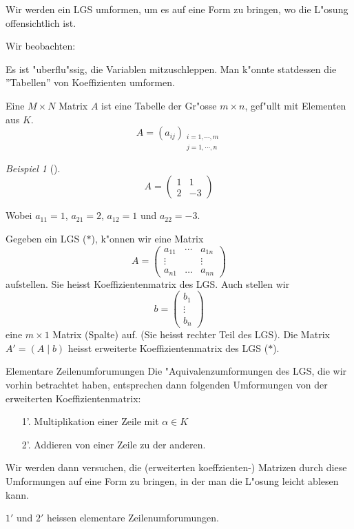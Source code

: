 \documentclass[11pt]{article}
\theoremstyle{remark}
\newtheorem{exa}{Beispiel}[section]
\theoremstyle{definition}
\theoremstyle{remark}
\begin{document}
Wir werden ein LGS umformen, um es auf eine Form zu bringen, wo die L"osung
offensichtlich ist.

Wir beobachten:
\begin{relation}
Es ist "uberflu"ssig, die Variablen mitzuschleppen. Man k"onnte statdessen die
''Tabellen'' von Koeffizienten umformen.
\end{relation}

\begin{definition}{}{}
Eine \(M\times N\) Matrix \(A\) ist eine Tabelle der Gr"osse \(m\times n\), gef"ullt
mit Elementen aus \(K\).  
\[A=(a_{ij})_{\substack{i=1,\cdots,m \\ j=1,\cdots,n}}\]
\end{definition}

\begin{exa}[] \label{}
\[
  A=\left( \begin{matrix} 1& 1\\ 2& -3\end{matrix} \right)
\]

Wobei \(a_{11} = 1\), \(a_{21} = 2\), \(a_{12}=1\) und \(a_{22}=-3\).
\end{exa}

\begin{relation}
Gegeben ein LGS (\(*\)), k"onnen wir eine Matrix \[ A=\left( \begin{matrix}
a_{11}& \cdots & a_{1n}\\ \vdots & & \vdots \\ a_{n1}& \ldots &
a_{nn}\end{matrix} \right) \] aufstellen. Sie heisst Koeffizientenmatrix des
LGS. Auch stellen wir \[b=\left( \begin{matrix} b_{1}\\ \vdots
\\ b_{n}\end{matrix} \right)\]
eine \(m\times 1\) Matrix (Spalte) auf. (Sie
heisst rechter Teil des LGS). Die Matrix \(A'=(A\mid b)\) heisst erweiterte
Koeffizientenmatrix des LGS (\(*\)).
\end{relation}


\begin{definition}{Elementare Zeilenumforumungen}{}
Die "Aquivalenzumformungen des LGS, die wir vorhin betrachtet haben, entsprechen
dann folgenden Umformungen von der erweiterten Koeffizientenmatrix: 
\begin{itemize}
 \item[1'.] Multiplikation einer Zeile mit $\alpha \in K$
 \item[2'.] Addieren von einer Zeile zu der anderen.
\end{itemize}
Wir werden dann versuchen, die (erweiterten koeffzienten-) Matrizen durch diese
Umformungen auf eine Form zu bringen, in der man die L"osung leicht ablesen
kann.

\(1'\) und \(2'\) heissen elementare Zeilenumforumungen.
\end{definition}
\end{document}
